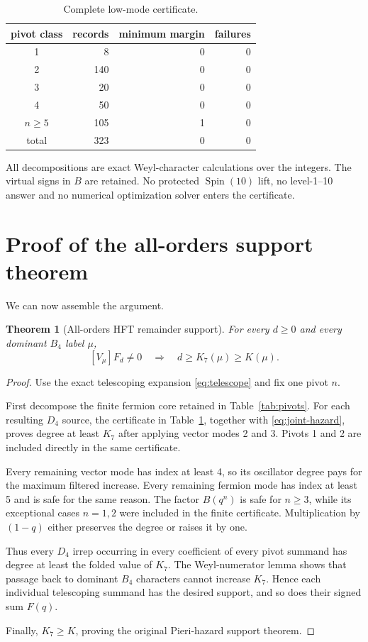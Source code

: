 \documentclass[11pt,a4paper]{article}
\newtheorem{theorem}{Theorem}[section]
\theoremstyle{definition}
\newcommand{\Spin}{\operatorname{Spin}}
\newcommand{\Kseven}{K_{7}}
\begin{document}
\begin{table}[ht]
\centering
\caption{Complete low-mode certificate.}
\label{tab:certificate}
\begin{tabular}{crrr}
\toprule
pivot class & records & minimum margin & failures \\
\midrule
1 & 8 & 0 & 0 \\
2 & 140 & 0 & 0 \\
3 & 20 & 0 & 0 \\
4 & 50 & 0 & 0 \\
$n\geq5$ & 105 & 1 & 0 \\
\midrule
total & 323 & 0 & 0 \\
\bottomrule
\end{tabular}
\end{table}

All decompositions are exact Weyl-character calculations over the integers.
The virtual signs in $B$ are retained.  No protected $\Spin(10)$ lift, no
level-1--10 answer and no numerical optimization solver enters the
certificate.

\section{Proof of the all-orders support theorem}

We can now assemble the argument.

\begin{theorem}[All-orders HFT remainder support]
For every $d\geq0$ and every dominant $B_4$ label $\mu$,
\[
   [V_\mu]F_d\neq0
   \quad\Longrightarrow\quad
   d\geq\Kseven(\mu)\geq K(\mu).
\]
\end{theorem}

\begin{proof}
Use the exact telescoping expansion \eqref{eq:telescope} and fix one pivot
$n$.

First decompose the finite fermion core retained in
Table~\ref{tab:pivots}.  For each resulting $D_4$ source, the certificate in
Table~\ref{tab:certificate}, together with
\eqref{eq:joint-hazard}, proves degree at least $\Kseven$ after applying
vector modes 2 and 3.  Pivots 1 and 2 are included directly in the same
certificate.

Every remaining vector mode has index at least 4, so its oscillator degree
pays for the maximum filtered increase.  Every remaining fermion mode has
index at least 5 and is safe for the same reason.  The factor $B(q^n)$ is
safe for $n\geq3$, while its exceptional cases $n=1,2$ were included in the
finite certificate.  Multiplication by $(1-q)$ either preserves the degree or
raises it by one.

Thus every $D_4$ irrep occurring in every coefficient of every pivot summand
has degree at least the folded value of $\Kseven$.  The Weyl-numerator lemma
shows that passage back to dominant $B_4$ characters cannot increase
$\Kseven$.  Hence each individual telescoping summand has the desired
support, and so does their signed sum $F(q)$.

Finally, $\Kseven\geq K$, proving the original Pieri-hazard support theorem.
\end{proof}
\end{document}

